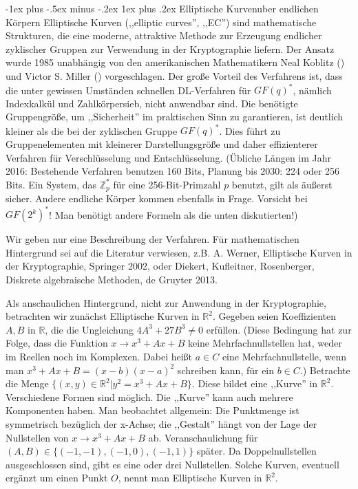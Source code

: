 \documentclass[a4paper]{article}
\makeatletter
\renewcommand{\subsubsection}{\@startsection{subsubsection}{3}{0mm}%
 {-1ex plus -.5ex minus -.2ex}%
 {1ex plus .2ex}%
 {\normalfont\small\bfseries}}
\makeatother
\begin{document}
\begin{multicols}{3}
        \subsubsection{Elliptische Kurvenuber endlichen Körpern}
        Elliptische Kurven (,,elliptic curves'', ,,EC'') sind mathematische Strukturen, die eine moderne, attraktive Methode zur Erzeugung endlicher zyklischer Gruppen zur Verwendung in der Kryptographie liefern. Der Ansatz wurde 1985 unabhängig von den amerikanischen Mathematikern Neal Koblitz () und Victor S. Miller () vorgeschlagen. Der große Vorteil des Verfahrens ist, dass die unter gewissen Umständen schnellen DL-Verfahren für $GF(q)^*$, nämlich Indexkalkül und Zahlkörpersieb, nicht anwendbar sind. Die benötigte Gruppengröße, um ,,Sicherheit'' im praktischen Sinn zu garantieren, ist deutlich kleiner als die bei der zyklischen Gruppe $GF(q)^*$. Dies führt zu Gruppenelementen mit kleinerer Darstellungsgröße und daher effizienterer Verfahren für Verschlüsselung und Entschlüsselung.
        (Übliche Längen im Jahr 2016: Bestehende Verfahren benutzen 160 Bits, Planung bis 2030: 224 oder 256 Bits. Ein System, das $\mathbb{Z}^*_p$ für eine 256-Bit-Primzahl $p$ benutzt, gilt als äußerst sicher. Andere endliche Körper kommen ebenfalls in Frage. Vorsicht bei $GF(2^k)^*$! Man benötigt andere Formeln als die unten diskutierten!)

        Wir geben nur eine Beschreibung der Verfahren. Für mathematischen Hintergrund sei auf die Literatur verwiesen, z.B. A. Werner, Elliptische Kurven in der Kryptographie, Springer 2002, oder Diekert, Kufleitner, Rosenberger, Diskrete algebraische Methoden, de Gruyter 2013.

        Als anschaulichen Hintergrund, nicht zur Anwendung in der Kryptographie, betrachten wir zunächst Elliptische Kurven in $\mathbb{R}^2$. Gegeben seien Koeffizienten $A, B$ in $\mathbb{R}$, die die Ungleichung $4A^3+ 27B^3 \not= 0$ erfüllen. (Diese Bedingung hat zur Folge, dass die Funktion $x\rightarrow x^3+Ax+B$ keine Mehrfachnullstellen hat, weder im Reellen noch im Komplexen. Dabei heißt $a\in C$ eine Mehrfachnullstelle, wenn man $x^3+Ax+B= (x-b)(x-a)^2$ schreiben kann, für ein $b\in C$.) Betrachte die Menge $\{(x,y)\in\mathbb{R}^2| y^2=x^3+Ax+B\}$.
        Diese bildet eine ,,Kurve'' in $\mathbb{R}^2$. Verschiedene Formen sind möglich. Die ,,Kurve'' kann auch mehrere Komponenten haben. Man beobachtet allgemein: Die Punktmenge ist symmetrisch bezüglich der x-Achse; die ,,Gestalt'' hängt von der Lage der Nullstellen von $x\rightarrow x^3+Ax+B$ ab. Veranschaulichung für $(A,B)\in\{(- 1 ,-1),(- 1 ,0),(- 1 ,1)\}$ später. Da Doppelnullstellen ausgeschlossen sind, gibt es eine oder drei Nullstellen.
        Solche Kurven, eventuell ergänzt um einen Punkt $O$, nennt man Elliptische Kurven in $\mathbb{R}^2$.


\end{multicols}
\end{document}
